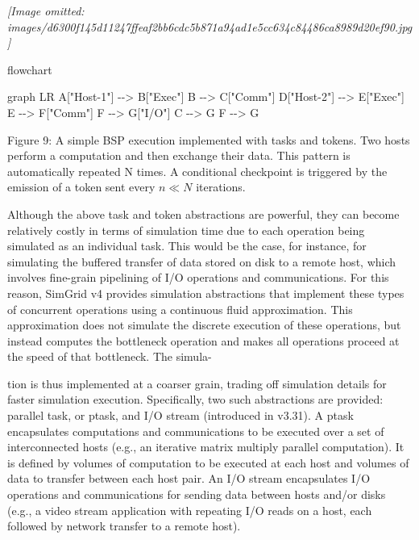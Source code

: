 \documentclass[
]{article}
\newenvironment{Shaded}{}{}
\newcommand{\NormalTok}[1]{#1}
\begin{document}
\textit{[Image omitted: images/d6300f145d11247ffeaf2bb6cdc5b871a94ad1e5cc634c84486ca8989d20ef90.jpg]}

flowchart

\begin{Shaded}
\begin{Highlighting}[]
\NormalTok{graph LR}
\NormalTok{    A["Host{-}1"] {-}{-}\textgreater{} B["Exec"]}
\NormalTok{    B {-}{-}\textgreater{} C["Comm"]}
\NormalTok{    D["Host{-}2"] {-}{-}\textgreater{} E["Exec"]}
\NormalTok{    E {-}{-}\textgreater{} F["Comm"]}
\NormalTok{    F {-}{-}\textgreater{} G["I/O"]}
\NormalTok{    C {-}{-}\textgreater{} G}
\NormalTok{    F {-}{-}\textgreater{} G}
\end{Highlighting}
\end{Shaded}

Figure 9: A simple BSP execution implemented with tasks and tokens. Two
hosts perform a computation and then exchange their data. This pattern
is automatically repeated N times. A conditional checkpoint is triggered
by the emission of a token sent every \(n \ll N\) iterations.

Although the above task and token abstractions are powerful, they can
become relatively costly in terms of simulation time due to each
operation being simulated as an individual task. This would be the case,
for instance, for simulating the buffered transfer of data stored on
disk to a remote host, which involves fine-grain pipelining of I/O
operations and communications. For this reason, SimGrid v4 provides
simulation abstractions that implement these types of concurrent
operations using a continuous fluid approximation. This approximation
does not simulate the discrete execution of these operations, but
instead computes the bottleneck operation and makes all operations
proceed at the speed of that bottleneck. The simula-

tion is thus implemented at a coarser grain, trading off simulation
details for faster simulation execution. Specifically, two such
abstractions are provided: parallel task, or ptask, and I/O stream
(introduced in v3.31). A ptask encapsulates computations and
communications to be executed over a set of interconnected hosts (e.g.,
an iterative matrix multiply parallel computation). It is defined by
volumes of computation to be executed at each host and volumes of data
to transfer between each host pair. An I/O stream encapsulates I/O
operations and communications for sending data between hosts and/or
disks (e.g., a video stream application with repeating I/O reads on a
host, each followed by network transfer to a remote host).
\end{document}
